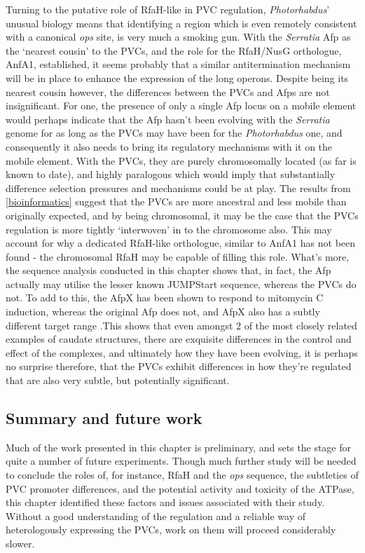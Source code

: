Turning to the putative role of RfaH-like in PVC regulation, \emph{Photorhabdus}' unusual biology means that identifying a region which is even remotely consistent with a canonical \emph{ops} site, is very much a smoking gun. With the \emph{Serratia} Afp as the `nearest cousin' to the PVCs, and the role for the RfaH/NusG orthologue, AnfA1, established, it seems probably that a similar antitermination mechanism will be in place to enhance the expression of the long operons. Despite being its nearest cousin however, the differences between the PVCs and Afps are not insignificant. For one, the presence of only a single Afp locus on a mobile element would perhaps indicate that the Afp hasn't been evolving with the \emph{Serratia} genome for as long as the PVCs may have been for the \emph{Photorhabdus} one, and consequently it also needs to bring its regulatory mechanisms with it on the mobile element. With the PVCs, they are purely chromosomally located (as far is known to date), and highly paralogous which would imply that substantially difference selection pressures and mechanisms could be at play. The results from \vref{bioinformatics} suggest that the PVCs are more ancestral and less mobile than originally expected, and by being chromosomal, it may be the case that the PVCs regulation is more tightly `interwoven' in to the chromosome also. This may account for why a dedicated RfaH-like orthologue, similar to AnfA1 has not been found - the chromosomal RfaH may be capable of filling this role. What's more, the sequence analysis conducted in this chapter shows that, in fact, the Afp actually may utilise the lesser known JUMPStart sequence, whereas the PVCs do not. To add to this, the AfpX has been shown to respond to mitomycin C induction, whereas the original Afp does not, and AfpX also has a subtly different target range \citep{Hurst2018}.This shows that even amongst 2 of the most closely related examples of caudate structures, there are exquisite differences in the control and effect of the complexes, and ultimately how they have been evolving, it is perhaps no surprise therefore, that the PVCs exhibit differences in how they're regulated that are also very subtle, but potentially significant.


\subsection{Summary and future work}

Much of the work presented in this chapter is preliminary, and sets the stage for quite a number of future experiments. Though much further study will be needed to conclude the roles of, for instance, RfaH and the \emph{ops} sequence, the subtleties of PVC promoter differences, and the potential activity and toxicity of the ATPase, this chapter identified these factors and issues associated with their study. Without a good understanding of the regulation and a reliable way of heterologously expressing the PVCs, work on them will proceed considerably slower.

